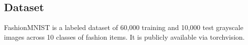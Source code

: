 \documentclass[a4paper, journal]{IEEEtran}
\begin{document}
\subsection{Dataset}
FashionMNIST is a labeled dataset of 60,000 training and 10,000 test grayscale images across 10 classes of fashion items. It is publicly available via torchvision.




\end{document}
